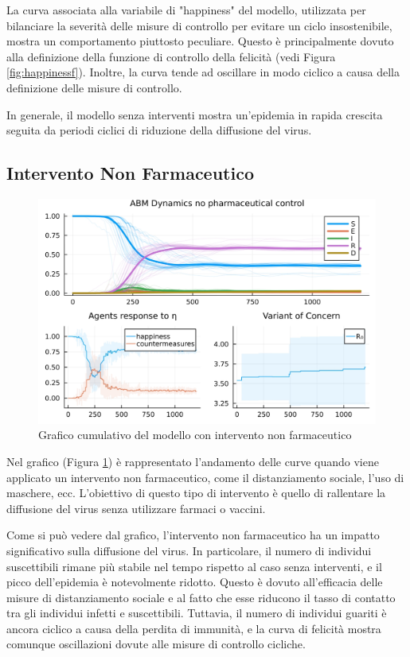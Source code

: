 La curva associata alla variabile di "happiness" del modello, 
utilizzata per bilanciare la severità delle misure di controllo 
per evitare un ciclo insostenibile, mostra un comportamento 
piuttosto peculiare. Questo è principalmente dovuto alla 
definizione della funzione di controllo della felicità 
(vedi Figura \ref{fig:happinessf}). Inoltre, la curva tende 
ad oscillare in modo ciclico a causa della definizione delle 
misure di controllo.

In generale, il modello senza interventi mostra un'epidemia in 
rapida crescita seguita da periodi ciclici di riduzione della 
diffusione del virus.

\subsection{Intervento Non Farmaceutico}

\begin{figure}[H]
    \begin{center}
		\includegraphics[width=\textwidth]{img/SocialNetworkABM_CONTROL.jpg}
		\caption{Grafico cumulativo del modello con intervento non farmaceutico}
		\label{fig:abm_nonpharm_intervent}
	\end{center}
\end{figure}

Nel grafico (Figura \ref{fig:abm_nonpharm_intervent}) è 
rappresentato l'andamento delle curve quando viene applicato un 
intervento non farmaceutico, come il distanziamento sociale, 
l'uso di maschere, ecc. L'obiettivo di questo tipo di intervento 
è quello di rallentare la diffusione del virus senza utilizzare 
farmaci o vaccini.

Come si può vedere dal grafico, l'intervento non farmaceutico 
ha un impatto significativo sulla diffusione del virus. 
In particolare, il numero di individui suscettibili rimane 
più stabile nel tempo rispetto al caso senza interventi, e il 
picco dell'epidemia è notevolmente ridotto. Questo è dovuto 
all'efficacia delle misure di distanziamento sociale e al fatto 
che esse riducono il tasso di contatto tra gli individui infetti 
e suscettibili. Tuttavia, il numero di individui guariti è ancora 
ciclico a causa della perdita di immunità, e la curva di felicità 
mostra comunque oscillazioni dovute alle misure di controllo cicliche.

